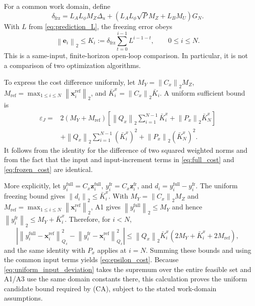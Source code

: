 ﻿\documentclass[journal]{IEEEtran}
\newcommand{\vx}{\mathbf{x}}
\newcommand{\vz}{\mathbf{z}}
\newcommand{\ve}{\mathbf{e}}
\newcommand{\norm}[1]{\left\lVert #1\right\rVert}
\begin{document}
For a common work domain, define
\begin{equation}
    \delta_{\mathrm{frz}}=L_AL_\phi M_Z\Delta_u
    +\left(L_AL_\phi\sqrt{P}M_Z+L_BM_U\right)G_N.
    \label{eq:freezing_driver}
\end{equation}
With $L$ from \eqref{eq:prediction_L}, the freezing error obeys
\begin{equation}
    \norm{\ve_i}_2\le K_i:=\delta_{\mathrm{frz}}
    \sum_{t=0}^{i-1}L^{i-1-t},\qquad 0\le i\le N.
    \label{eq:freezing_bound}
\end{equation}
This is a same-input, finite-horizon open-loop comparison. In particular, it is not a comparison of two optimization algorithms.

To express the cost difference uniformly, let $M_Y=\norm{C_x}_2M_Z$, $M_{\mathrm{ref}}=\max_{1\le i\le N}\norm{\vx_i^{\mathrm{ref}}}_2$, and $\bar K_i^x=\norm{C_x}_2\bar K_i$. A uniform sufficient bound is
\begin{align}
\varepsilon_J={}&2(M_Y+M_{\mathrm{ref}})
 \left[\norm{Q_x}_2\sum_{i=1}^{N-1}\bar K_i^x+\norm{P_x}_2\bar K_N^x\right]\\
&+\norm{Q_x}_2\sum_{i=1}^{N-1}(\bar K_i^x)^2+\norm{P_x}_2(\bar K_N^x)^2.
\label{eq:epsilon_cost}
\end{align}
It follows from the identity for the difference of two squared weighted norms and from the fact that the input and input-increment terms in \eqref{eq:full_cost} and \eqref{eq:frozen_cost} are identical.

More explicitly, let $y_i^{\mathrm{full}}=C_x\vz_i^{\mathrm{full}}$, $y_i^{\mathrm{fr}}=C_x\vz_i^{\mathrm{fr}}$, and $d_i=y_i^{\mathrm{full}}-y_i^{\mathrm{fr}}$. The uniform freezing bound gives $\norm{d_i}_2\le\bar K_i^x$. With $M_Y=\norm{C_x}_2M_Z$ and $M_{\mathrm{ref}}=\max_{1\le i\le N}\norm{\vx_i^{\mathrm{ref}}}_2$, A1 gives $\norm{y_i^{\mathrm{full}}}_2\le M_Y$ and hence $\norm{y_i^{\mathrm{fr}}}_2\le M_Y+\bar K_i^x$. Therefore, for $i<N$,
\begin{equation}
\left|\norm{y_i^{\mathrm{full}}-\vx_i^{\mathrm{ref}}}_{Q_x}^2-
\norm{y_i^{\mathrm{fr}}-\vx_i^{\mathrm{ref}}}_{Q_x}^2\right|
\le\norm{Q_x}_2\bar K_i^x(2M_Y+\bar K_i^x+2M_{\mathrm{ref}}),
\end{equation}
and the same identity with $P_x$ applies at $i=N$. Summing these bounds and using the common input terms yields \eqref{eq:epsilon_cost}. Because \eqref{eq:uniform_input_deviation} takes the supremum over the entire feasible set and A1/A3 use the same domain constants there, this calculation proves the uniform candidate bound required by (CA), subject to the stated work-domain assumptions.
\end{document}
